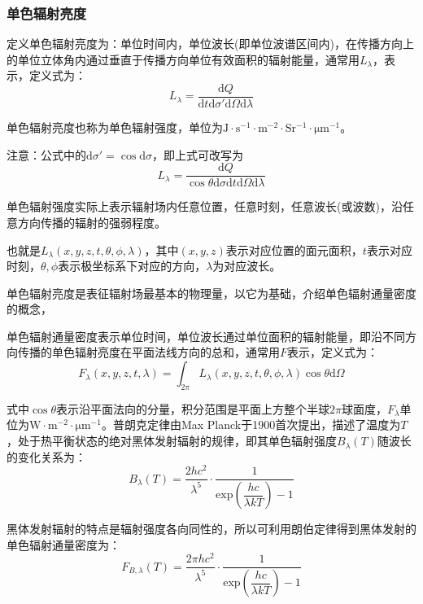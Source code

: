 \documentclass[UTF8,a4paper,11pt,oneside]{ctexbook}
\begin{document}
\subsubsection{单色辐射亮度}

定义单色辐射亮度为：单位时间内，单位波长(即单位波谱区间内)，在传播方向上的单位立体角内通过垂直于传播方向单位有效面积的辐射能量，通常用\(L_\lambda\)，表示，定义式为：
\begin{equation}
L_\lambda=\dfrac{\mathrm{d}Q}{\mathrm{d}t\mathrm{d}\sigma'\mathrm{d}\Omega\mathrm{d}\lambda}
\end{equation}

单色辐射亮度也称为单色辐射强度，单位为\(\mathrm{J\cdot{}s^{-1}\cdot{}m^{-2}\cdot{}Sr^{-1}\cdot{}\mathrm{\mu{}m}^{-1}}\)。

注意：公式中的\(\mathrm{d}\sigma'=\cos{}\mathrm{d}\sigma\)，即上式可改写为
\begin{equation}
L_\lambda=\dfrac{\mathrm{d}Q}{\cos{}\theta\mathrm{d}\sigma\mathrm{d}t\mathrm{d}\Omega\mathrm{d}\lambda}
\end{equation}

单色辐射强度实际上表示辐射场内任意位置，任意时刻，任意波长(或波数)，沿任意方向传播的辐射的强弱程度。

也就是\(L_\lambda(x,y,z,t,\theta,\phi,\lambda)\)，其中\((x,y,z)\)表示对应位置的面元面积，\(t\)表示对应时刻，\(\theta,\phi\)表示极坐标系下对应的方向，\(\lambda\)为对应波长。

单色辐射亮度是表征辐射场最基本的物理量，以它为基础，介绍单色辐射通量密度的概念，

单色辐射通量密度表示单位时间，单位波长通过单位面积的辐射能量，即沿不同方向传播的单色辐射亮度在平面法线方向的总和，通常用\(F\)表示，定义式为：
\begin{equation}
F_\lambda(x,y,z,t,\lambda)=\int_{2\pi}L_\lambda(x,y,z,t,\theta,\phi,\lambda)\cos{}\theta\mathrm{d}\Omega
\end{equation}

式中\(\cos\theta\)表示沿平面法向的分量，积分范围是平面上方整个半球\(2\pi\)球面度，\(F_\lambda\)单位为\(\mathrm{W\cdot{}m^{-2}\cdot\mathrm{\mu{}m}^{-1}}\)。普朗克定律由Max Planck于1900首次提出，描述了温度为\(T\)，处于热平衡状态的绝对黑体发射辐射的规律，即其单色辐射强度\(B_\lambda(T)\)随波长的变化关系为：
\begin{equation}
B_\lambda(T)=\dfrac{2hc^2}{\lambda^5}\cdot\dfrac{1}{\mathrm{exp}\left(\dfrac{hc}{\lambda{}kT}\right)-1}
\end{equation}

黑体发射辐射的特点是辐射强度各向同性的，所以可利用朗伯定律得到黑体发射的单色辐射通量密度为：
\begin{equation}
F_{B,\lambda}(T)=\dfrac{2\pi{}hc^2}{\lambda^5}\cdot\dfrac{1}{\mathrm{exp}\left(\dfrac{hc}{\lambda{}kT}\right)-1}
\end{equation}
\end{document}
